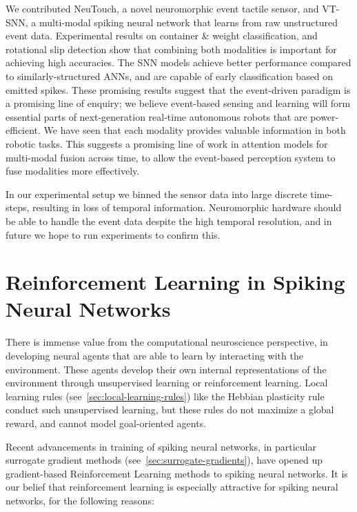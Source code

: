 \documentclass[fyp]{socreport}
\begin{document}
We contributed NeuTouch, a novel neuromorphic event tactile sensor, and VT-SNN,
a multi-modal spiking neural network that learns from raw unstructured event
data. Experimental results on container \& weight classification, and rotational
slip detection show that combining both modalities is important for achieving
high accuracies. The SNN models achieve better performance compared to
similarly-structured ANNs, and are capable of early classification based on
emitted spikes. These promising results suggest that the event-driven paradigm
is a promising line of enquiry; we believe event-based sensing and learning will
form essential parts of next-generation real-time autonomous robots that are
power-efficient. We have seen that each modality provides valuable information
in both robotic tasks. This suggests a promising line of work in attention
models for multi-modal fusion across time, to allow the event-based perception
system to fuse modalities more effectively.

In our experimental setup we binned the sensor data into large discrete
time-steps, resulting in loss of temporal information. Neuromorphic hardware
should be able to handle the event data despite the high temporal resolution,
and in future we hope to run experiments to confirm this.

\printbibliography
\appendix

\chapter{Reinforcement Learning in Spiking Neural Networks\label{cha:snnrl}}

There is immense value from the computational neuroscience perspective, in
developing neural agents that are able to learn by interacting with the
environment. These agents develop their own internal representations of the
environment through unsupervised learning or reinforcement learning. Local
learning rules (see~\autoref{sec:local-learning-rules}) like the Hebbian
plasticity rule conduct such unsupervised learning, but these rules do not
maximize a global reward, and cannot model goal-oriented agents.

Recent advancements in training of spiking neural networks, in particular
surrogate gradient methods (see~\autoref{sec:surrogate-gradients}), have opened
up gradient-based Reinforcement Learning methods to spiking neural networks. It
is our belief that reinforcement learning is especially attractive for spiking
neural networks, for the following reasons:
\end{document}
